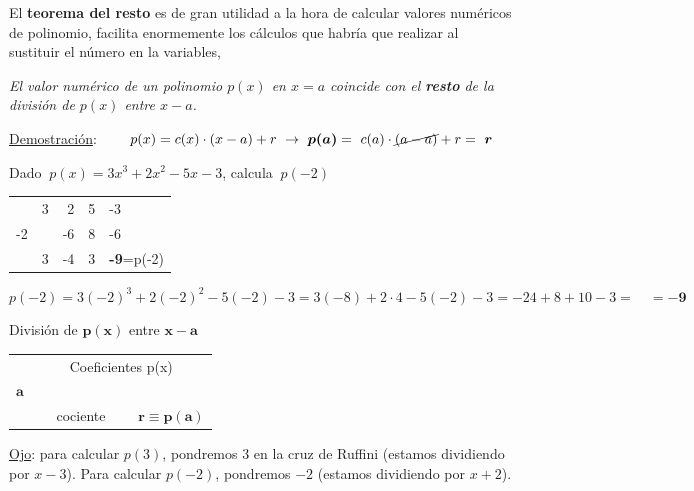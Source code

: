 \vspace{10mm} %
El \textbf{teorema del resto} es de gran utilidad a la hora de calcular valores numéricos de polinomio, facilita enormemente los cálculos que habría que realizar al sustituir el número en la variables,

\vspace{5mm}
\begin{theorem} 

\emph{El valor numérico de un polinomio $p(x)$ en $x=a$ coincide con el \textbf{resto} de la división de $p(x)$ entre $x-a$.}	
\end{theorem}

\underline{Demostración}: $\qquad p(x)=c(x)\cdot (x-a)+r \ \to \ \boldsymbol{p(a)}=\ c(a)\cdot\cancel{(a-a)}+r=\ \boldsymbol r$ \QED


\vspace{10mm} %
\begin{miejemplo}

Dado $\ p(x)=3x^3+2x^2-5x-3$, calcula $\ p(-2)$	

\begin{multicols}{2}

\begin{table}[H]
\centering
\begin{tabular}{r|rrrl}
 & 3 & 2 & 5 & -3 \\
-2 &  & -6 & 8 & -6 \\ \hline
 & 3 & -4 & \multicolumn{1}{r|}{3} & \textbf{-9}=p(-2) \\ \cline{5-5} 
\end{tabular}
\end{table}

$p(-2)=3(-2)^3+2(-2)^2-5(-2)-3=3(-8)+2\cdot 4 -5(-2)-3=-24+8+10-3= \quad \boldsymbol{= -9}$
\end{multicols}
\end{miejemplo}

\vspace{5mm}
\begin{adjustwidth}{100pt}{100pt}
\begin{destacado}
\color{NavyBlue}
División de $\boldsymbol{p(x)}$ entre $\boldsymbol{x-a}$
\begin{table}[H]
\color{NavyBlue}
\centering
\begin{tabular}{c|cccc}
 & \multicolumn{4}{c}{Coeficientes p(x)} \\
$\boldsymbol a$ &  &  &  &  \\ \hline
 & \multicolumn{3}{c|}{$\quad$ cociente $\quad$} & $\boldsymbol{r\equiv p(a)}$ \\ \cline{5-5} 
\end{tabular}
\end{table}
\color{black}
\end{destacado}
\end{adjustwidth}
\textcolor{gris}{\underline{Ojo}: para calcular $p(3)$, pondremos $3$ en la cruz de Ruffini (estamos dividiendo por $x-3$). Para calcular $p(-2)$, pondremos $-2$ (estamos dividiendo por $x+2$).}

